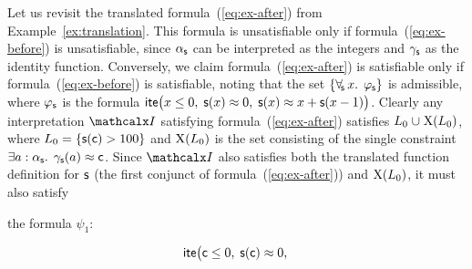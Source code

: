 \begin{example}
Let us revisit the translated formula~(\ref{eq:ex-after}) from
Example~\ref{ex:translation}. 
This formula is unsatisfiable only if
formula~(\ref{eq:ex-before}) is unsatisfiable, since $\alpha_{\mathsf{s}}$ can be
interpreted as the integers and $\gamma_{\mathsf{s}}$ as the identity
function. Conversely, we claim formula~(\ref{eq:ex-after}) is satisfiable
only if formula~(\ref{eq:ex-before}) is satisfiable, noting that the set
$\{ \forall_{\!\mathsf{s}\:} x.\;\, \varphi_{\mathsf{s}} \}$ is admissible,
where $\varphi_{\mathsf{s}}$ is the formula $\mathsf{ite}\bigl( x \leq 0,\; \mathsf{s}(x) \approx 0,\; \mathsf{s}( x ) \approx x + \mathsf{s}( x-1 ) \bigr)$.
Clearly any interpretation $\I$ satisfying formula~(\ref{eq:ex-after}) satisfies 
$L_0 \cup \absconstraints( L_0 )$,
where $L_0 = \{ \mathsf{s}( \mathsf{c} ) > 100 \}$
and $\mathrm{X}( L_0 )$ is the set consisting of the single constraint
$\exists a : {\alpha_{\mathsf{s}}}.\;\, \gamma_{\mathsf{s}}( a ) \approx \mathsf{c}$.
Since $\I$ also satisfies both the translated function definition for $\mathsf{s}$
(the first conjunct of formula~(\ref{eq:ex-after})) and $\mathrm{X}( L_0
)$, it must also satisfy\begin{longv} the formula $\psi_1$:\end{longv}
\[
\mathsf{ite}\bigl( \mathsf{c} \leq 0,\; 
            \mathsf{s}(\mathsf{c}) \approx 0,\;
\]
\end{example}
